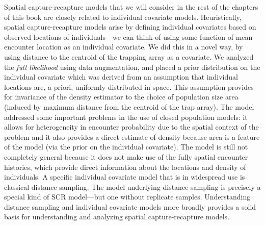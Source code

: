 Spatial capture-recapture models that we will consider in the rest of
the chapters of this book are closely related to 
individual covariate models. Heuristically, spatial capture-recapture
models arise by defining individual covariates based on observed
locations of individuals---we can think of using some function of
mean encounter location as an individual covariate. We did this in a
novel way, by using distance to the centroid of the trapping array as
a covariate. We analyzed the {\it full likelihood} using data
augmentation, and placed a prior distribution on the individual
covariate which was derived from an assumption that individual
locations are, a priori, uniformly distributed in space. This
assumption provides for invariance of the density estimator to the
choice of population size area (induced by maximum distance from the
centroid of the trap array). The model addressed some important problems in the
use of closed population models: it allows for heterogeneity in
encounter probability due to the spatial context of the problem and it
also provides a direct estimate of density because area is a feature
of the model (via the prior on the individual covariate). The model is
still not completely general because it does not make use of
the fully spatial encounter histories, which provide direct
information about the locations and density of individuals.  A
specific individual covariate model that is in widespread use is
classical distance sampling. The model underlying distance
sampling is precisely a special kind of SCR model---but one without
replicate samples. Understanding distance sampling and individual
covariate models more broadly provides a solid basis for understanding
and analyzing spatial capture-recapture models.

